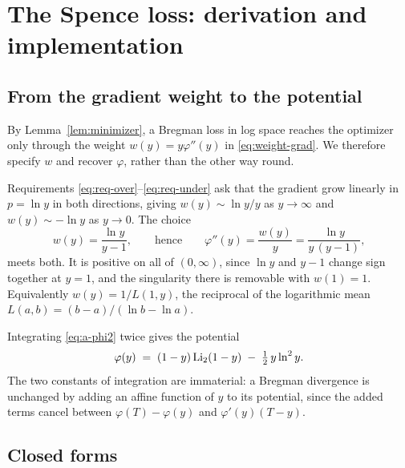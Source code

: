 \section{The Spence loss: derivation and implementation}
\label{sec:A_spence}

\subsection{From the gradient weight to the potential}

By Lemma~\ref{lem:minimizer}, a Bregman loss in log space reaches the
optimizer only through the weight $w(y)=y\varphi''(y)$ in
\eqref{eq:weight-grad}. We therefore specify $w$ and recover $\varphi$, rather
than the other way round.

Requirements \eqref{eq:req-over}--\eqref{eq:req-under} ask that the gradient
grow linearly in $p=\ln y$ in both directions, giving $w(y)\sim \ln y/y$ as
$y\to\infty$ and $w(y)\sim-\ln y$ as $y\to0$. The choice
\begin{equation}
  w(y)=\frac{\ln y}{y-1},
  \qquad\text{hence}\qquad
  \varphi''(y)=\frac{w(y)}{y}=\frac{\ln y}{y\,(y-1)},
  \label{eq:a-phi2}
\end{equation}
meets both. It is positive on all of $(0,\infty)$, since $\ln y$ and $y-1$
change sign together at $y=1$, and the singularity there is removable with
$w(1)=1$. Equivalently $w(y)=1/L(1,y)$, the reciprocal of the logarithmic mean
$L(a,b)=(b-a)/(\ln b-\ln a)$.

Integrating \eqref{eq:a-phi2} twice gives the potential
\begin{equation}
  \varphi(y) \;=\; (1-y)\,\mathrm{Li}_2(1-y) \;-\; \tfrac12\,y\ln^{2}y .
  \label{eq:a-phi}
\end{equation}
The two constants of integration are immaterial: a Bregman divergence is
unchanged by adding an affine function of $y$ to its potential, since the
added terms cancel between $\varphi(T)-\varphi(y)$ and $\varphi'(y)(T-y)$.

\subsection{Closed forms}

